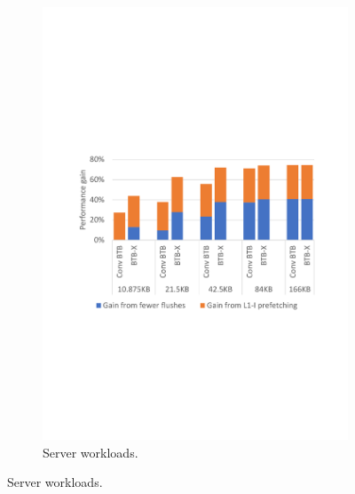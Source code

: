 \begin{figure}
    \centering
    \begin{subfigure}[t]{0.8\columnwidth}
        \centering
        \includegraphics[width=\columnwidth, trim=70 235 60 250, clip]{figures/serverRes3.pdf}
        \caption{Server workloads.}
        \vspace{-0.3in}
        \label{fig:serverPerf}
    \end{subfigure}
    

\end{figure}
